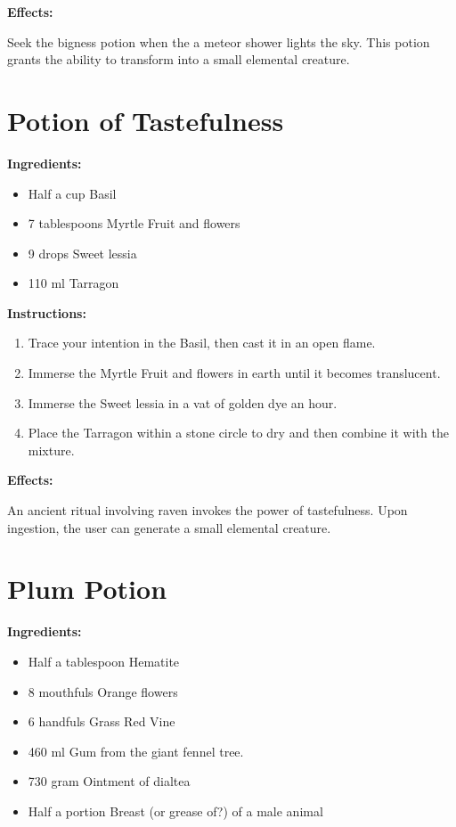 \documentclass{article}
\begin{document}
\textbf{Effects:}

Seek the bigness potion when the a meteor shower lights the sky. This potion grants the ability to transform into a small elemental creature.

\newpage
\section*{Potion of Tastefulness}

\textbf{Ingredients:}

\begin{itemize}
  \item Half a cup Basil
  \item 7 tablespoons Myrtle Fruit and flowers
  \item 9 drops Sweet lessia
  \item 110 ml Tarragon
\end{itemize}

\textbf{Instructions:}

\begin{enumerate}
  \item Trace your intention in the Basil, then cast it in an open flame.
  \item Immerse the Myrtle Fruit and flowers in earth until it becomes translucent.
  \item Immerse the Sweet lessia in a vat of golden dye an hour.
  \item Place the Tarragon within a stone circle to dry and then combine it with the mixture.
\end{enumerate}

\textbf{Effects:}

An ancient ritual involving raven invokes the power of tastefulness. Upon ingestion, the user can generate a small elemental creature.

\newpage
\section*{Plum Potion}

\textbf{Ingredients:}

\begin{itemize}
  \item Half a tablespoon Hematite
  \item 8 mouthfuls Orange flowers
  \item 6 handfuls Grass Red Vine
  \item 460 ml Gum from the giant fennel tree.
  \item 730 gram Ointment of dialtea
  \item Half a portion Breast (or grease of?) of a male animal
\end{itemize}
\end{document}
